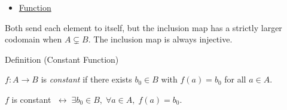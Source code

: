 \begin{dependencies}
\begin{itemize}
  \item \hyperref[def:function]{Function}
\end{itemize}
\end{dependencies}

\begin{remark*}
\label{def:inclusion}
Both send each element to itself, but the inclusion map has a strictly larger
codomain when $A \subsetneq B$. The inclusion map is always injective.
\end{remark*}

\begin{definitionbox}{Definition (Constant Function)}
\begin{definition}\label{def:constant}
$f : A \to B$ is \emph{constant} if there exists $b_0 \in B$ with
$f(a) = b_0$ for all $a \in A$.
\end{definition}
\end{definitionbox}

\NoLocalDependencies

\begin{remark*}
$f$ is constant $\;\leftrightarrow\; \exists b_0 \in B,\; \forall a \in A,\; f(a) = b_0$.
\end{remark*}
